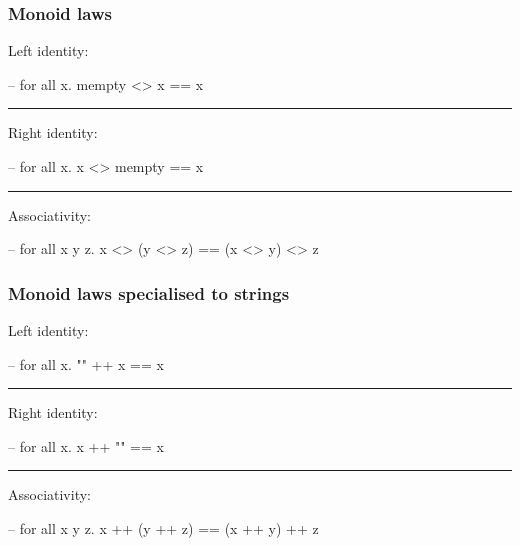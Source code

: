 \documentclass[UKenglish,usenames,dvipsnames,svgnames,table,aspectratio=169,mathserif]{beamer}
\begin{document}
\begin{frame}[fragile]
\frametitle{Monoid laws}
\begin{center}
\begin{minipage}{0.6\textwidth}
Left identity:

\begin{haskellcode}
-- for all x.
mempty <> x == x
\end{haskellcode}

\pause
\hrule
\bigskip

Right identity:

\begin{haskellcode}
-- for all x.
x <> mempty == x
\end{haskellcode}

\pause
\hrule
\bigskip

Associativity:

\begin{haskellcode}
-- for all x y z.
x <> (y <> z) == (x <> y) <> z
\end{haskellcode}

\end{minipage}
\end{center}
\end{frame}


\begin{frame}[fragile]
\frametitle{Monoid laws specialised to strings}
\begin{center}
\begin{minipage}{0.6\textwidth}
Left identity:

\begin{haskellcode}
-- for all x.
"" ++ x == x
\end{haskellcode}

\hrule
\bigskip

Right identity:

\begin{haskellcode}
-- for all x.
x ++ "" == x
\end{haskellcode}

\hrule
\bigskip

Associativity:

\begin{haskellcode}
-- for all x y z.
x ++ (y ++ z) == (x ++ y) ++ z
\end{haskellcode}

\end{minipage}
\end{center}
\end{frame}
\end{document}
